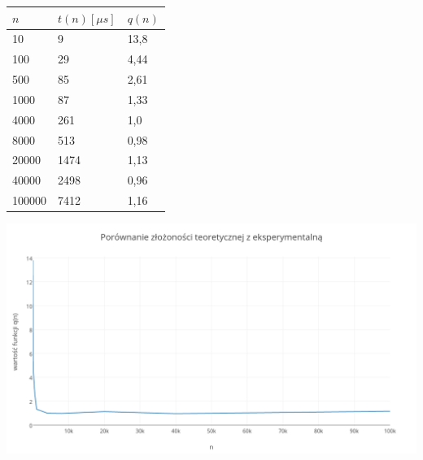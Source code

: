 \documentclass{article}
\begin{document}
	\begin{center}
		\begin{tabular}{l l l}
			\toprule
				$n$ & $t(n) [\mu s]$ & $q(n) $\\
			\midrule
				10 & 9 & 13,8 \\
				100 & 29 & 4,44 \\
				500 & 85 & 2,61 \\
				1000 & 87 & 1,33 \\
			\midrule
				4000 & 261 & 1,0 \\
			\midrule
				8000 & 513 & 0,98 \\
				20000 & 1474 & 1,13 \\
				40000 & 2498 & 0,96 \\
				100000 & 7412 & 1,16 \\
			\bottomrule
		\end{tabular}
	\end{center}

	\includegraphics[width=\textwidth]{plot.png}
\end{document}
